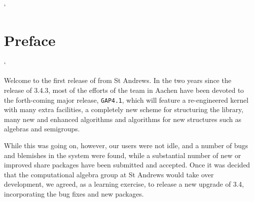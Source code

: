 \catcode`
\chapter*{Preface}
\catcode`

Welcome to the first release of {\GAP} from St Andrews. In the two
years since the release of {\GAP} 3.4.3, most of the efforts of the
{\GAP} team in Aachen have been devoted to the forth-coming major
release, {\tt GAP4.1}, which will feature a re-engineered kernel with
many extra facilities, a completely new scheme for structuring the
library, many new and enhanced algorithms and algorithms for new
structures such as algebras and semigroups. 

While this was going on, however, our users were not idle, and a
number of bugs and blemishes in the system were found, while a
substantial number of new or improved share packages have been
submitted and accepted. Once it was decided that the computational
algebra group at St Andrews would take over {\GAP} development, we
agreed, as a learning exercise, to release a new upgrade of {\GAP}
3.4, incorporating the bug fixes and new packages. 


